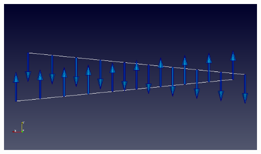 \documentclass[aspectratio=1610,t,10pt]{beamer}
\begin{document}
\begin{frame}
\begin{columns}[t]
\begin{column}{.48\textwidth}
\begin{minipage}{0.30\linewidth}
        \end{minipage}~~~~%
        \begin{minipage}{0.49\linewidth}
            \includegraphics[width=\linewidth]{img/Initial}
            

\end{minipage}
\end{column}
\end{columns}
\end{frame}
\end{document}
